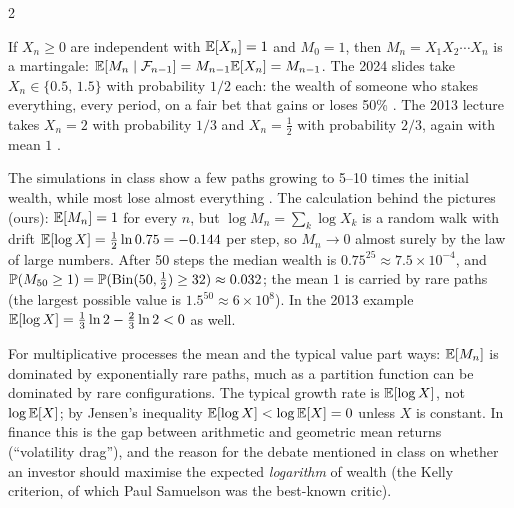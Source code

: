 \begin{paracol}{2}
\begin{example}[Products {\ts{24}{6}{4:15}}]\label{ch04:ex-m3}
If $X_n\ge0$ are independent with $\mathbb{E}[X_n]=1$ and $M_0=1$, then $M_n=X_1X_2\cdots X_n$ is a martingale:
$\mathbb{E}[M_n\mid\mathcal F_{n-1}]=M_{n-1}\mathbb{E}[X_n]=M_{n-1}$. The 2024 slides take $X_n\in\{0.5,\,1.5\}$ with
probability $1/2$ each: the wealth of someone who stakes everything, every period, on a fair bet that gains
or loses 50\% . The 2013 lecture takes $X_n=2$ with probability $1/3$ and $X_n=\tfrac12$
with probability $2/3$, again with mean $1$ .
\end{example}

The simulations in class show a few paths growing to 5--10 times the initial wealth, while most lose
almost everything . The calculation behind the pictures (ours): $\mathbb{E}[M_n]=1$ for every $n$, but
$\log M_n=\sum_k\log X_k$ is a random walk with drift $\mathbb{E}[\log X]=\tfrac12\ln0.75=-0.144$ per step, so
$M_n\to0$ almost surely by the law of large numbers. After 50 steps the median wealth is
$0.75^{25}\approx7.5\times10^{-4}$, and $\mathbb{P}(M_{50}\ge1)=\mathbb{P}(\mathrm{Bin}(50,\tfrac12)\ge32)\approx0.032$;
the mean $1$ is carried by rare paths (the largest possible value is $1.5^{50}\approx6\times10^8$). In the 2013
example $\mathbb{E}[\log X]=\tfrac13\ln2-\tfrac23\ln2<0$ as well.

\begin{intuition}
For multiplicative processes the mean and the typical value part ways: $\mathbb{E}[M_n]$ is dominated by
exponentially rare paths, much as a partition function can be dominated by rare configurations. The
typical growth rate is $\mathbb{E}[\log X]$, not $\log\mathbb{E}[X]$; by Jensen's inequality $\mathbb{E}[\log X]<\log\mathbb{E}[X]=0$ unless $X$ is
constant. In finance this is the gap between arithmetic and geometric mean returns (``volatility drag''),
and the reason for the debate mentioned in class  on whether an investor should maximise
the expected \emph{logarithm} of wealth (the Kelly criterion, of which Paul Samuelson was the best-known
critic).
\end{intuition}


\end{paracol}
